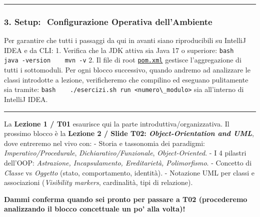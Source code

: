 \documentclass[11pt,a4paper]{article}
\newcommand{\passthrough}[1]{#1}
\begin{document}
\begin{center}\rule{0.5\linewidth}{0.5pt}\end{center}

\subsubsection{3. Setup: ️ Configurazione Operativa
dell'Ambiente}\label{setup-configurazione-operativa-dellambiente}

Per garantire che tutti i passaggi da qui in avanti siano riproducibili
su IntelliJ IDEA e da CLI: 1. Verifica che la JDK attiva sia Java 17 o
superiore: \passthrough{\lstinline!bash    java -version    mvn -v!} 2.
Il file di root
\href{file:///home/wally/Documenti/GitHub/Programmazione-II/25-26/esercizi-wally-25-26/pom.xml}{\passthrough{\lstinline!pom.xml!}}
gestisce l'aggregazione di tutti i sottomoduli. Per ogni blocco
successivo, quando andremo ad analizzare le classi introdotte a lezione,
verificheremo che compilino ed eseguano pulitamente sia tramite:
\passthrough{\lstinline!bash    ./esercizi.sh run <numero\_modulo>!} sia
all'interno di IntelliJ IDEA.

\begin{center}\rule{0.5\linewidth}{0.5pt}\end{center}

\begin{studynote} La \textbf{Lezione 1 / T01} esaurisce qui la parte
introduttiva/organizzativa. Il prossimo blocco è la \textbf{Lezione 2 /
Slide T02: \emph{Object-Orientation and UML}}, dove entreremo nel vivo
con: - Storia e tassonomia dei paradigmi: \emph{Imperativo/Procedurale},
\emph{Dichiarativo/Funzionale}, \emph{Object-Oriented}. - I 4 pilastri
dell'OOP: \emph{Astrazione, Incapsulamento, Ereditarietà, Polimorfismo}.
- Concetto di \emph{Classe} vs \emph{Oggetto} (stato, comportamento,
identità). - Notazione UML per classi e associazioni (\emph{Visibility
markers}, cardinalità, tipi di relazione).
\end{studynote}

\textbf{Dammi conferma quando sei pronto per passare a T02 (procederemo
analizzando il blocco concettuale un po' alla volta)!}
\end{document}
